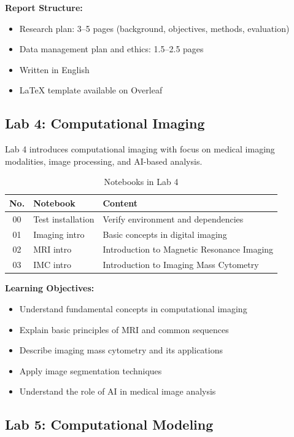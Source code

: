 \documentclass[11pt,a4paper]{article}
\begin{document}
\textbf{Report Structure:}
\begin{itemize}[nosep]
    \item Research plan: 3--5 pages (background, objectives, methods, evaluation)
    \item Data management plan and ethics: 1.5--2.5 pages
    \item Written in English
    \item LaTeX template available on Overleaf
\end{itemize}

\subsection{Lab 4: Computational Imaging}

Lab 4 introduces computational imaging with focus on medical imaging modalities, image processing, and AI-based analysis.

\begin{table}[htbp]
\centering
\caption{Notebooks in Lab 4}
\label{tab:lab4}
\begin{tabular}{@{}clp{7cm}@{}}
\toprule
\textbf{No.} & \textbf{Notebook} & \textbf{Content} \\
\midrule
00 & Test installation & Verify environment and dependencies \\
01 & Imaging intro & Basic concepts in digital imaging \\
02 & MRI intro & Introduction to Magnetic Resonance Imaging \\
03 & IMC intro & Introduction to Imaging Mass Cytometry \\
\bottomrule
\end{tabular}
\end{table}

\textbf{Learning Objectives:}
\begin{itemize}[nosep]
    \item Understand fundamental concepts in computational imaging
    \item Explain basic principles of MRI and common sequences
    \item Describe imaging mass cytometry and its applications
    \item Apply image segmentation techniques
    \item Understand the role of AI in medical image analysis
\end{itemize}

\subsection{Lab 5: Computational Modeling}
\end{document}
